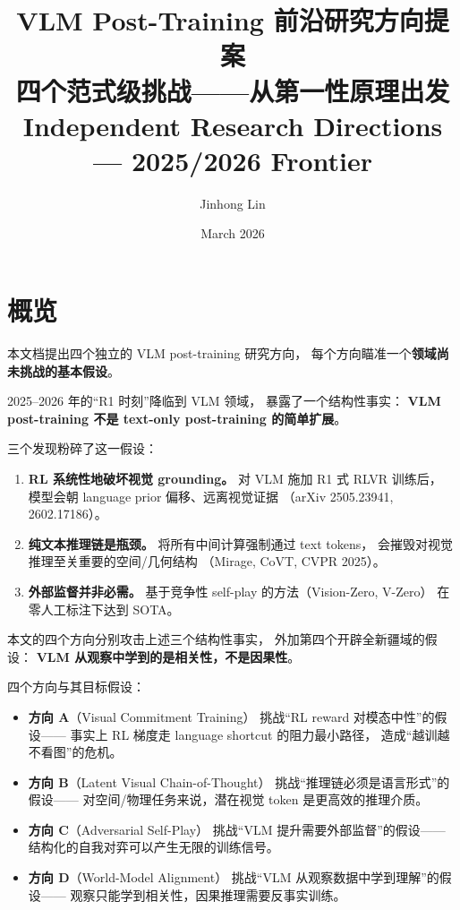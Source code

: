 \documentclass[12pt,a4paper]{article}
\title{\textbf{VLM Post-Training 前沿研究方向提案}\\
\large{四个范式级挑战——从第一性原理出发}\\[6pt]
\normalsize{Independent Research Directions --- 2025/2026 Frontier}}
\author{Jinhong Lin}
\date{March 2026}
\begin{document}
\maketitle

\section*{概览}

本文档提出四个独立的 VLM post-training 研究方向，
每个方向瞄准一个\textbf{领域尚未挑战的基本假设}。

\begin{insightbox}
2025--2026 年的``R1 时刻''降临到 VLM 领域，
暴露了一个结构性事实：
\textbf{VLM post-training 不是 text-only post-training 的简单扩展}。

三个发现粉碎了这一假设：
\begin{enumerate}[leftmargin=2em]
  \item \textbf{RL 系统性地破坏视觉 grounding。}
    对 VLM 施加 R1 式 RLVR 训练后，
    模型会朝 language prior 偏移、远离视觉证据
    （arXiv 2505.23941, 2602.17186）。
  \item \textbf{纯文本推理链是瓶颈。}
    将所有中间计算强制通过 text tokens，
    会摧毁对视觉推理至关重要的空间/几何结构
    （Mirage, CoVT, CVPR 2025）。
  \item \textbf{外部监督并非必需。}
    基于竞争性 self-play 的方法（Vision-Zero, V-Zero）
    在零人工标注下达到 SOTA。
\end{enumerate}

本文的四个方向分别攻击上述三个结构性事实，
外加第四个开辟全新疆域的假设：
\textbf{VLM 从观察中学到的是相关性，不是因果性}。
\end{insightbox}

\noindent
四个方向与其目标假设：

\begin{itemize}[leftmargin=2em]
  \item \textbf{方向 A}（Visual Commitment Training）
    挑战``RL reward 对模态中性''的假设——
    事实上 RL 梯度走 language shortcut 的阻力最小路径，
    造成``越训越不看图''的危机。
  \item \textbf{方向 B}（Latent Visual Chain-of-Thought）
    挑战``推理链必须是语言形式''的假设——
    对空间/物理任务来说，潜在视觉 token 是更高效的推理介质。
  \item \textbf{方向 C}（Adversarial Self-Play）
    挑战``VLM 提升需要外部监督''的假设——
    结构化的自我对弈可以产生无限的训练信号。
  \item \textbf{方向 D}（World-Model Alignment）
    挑战``VLM 从观察数据中学到理解''的假设——
    观察只能学到相关性，因果推理需要反事实训练。
\end{itemize}
\end{document}
